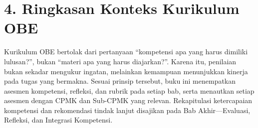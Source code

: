 \documentclass[../main.tex]{subfiles}
\begin{document}
\section*{4. Ringkasan Konteks Kurikulum OBE}

Kurikulum OBE bertolak dari pertanyaan ``kompetensi apa yang harus dimiliki
lulusan?'', bukan ``materi apa yang harus diajarkan?''. Karena itu, penilaian
bukan sekadar mengukur ingatan, melainkan kemampuan menunjukkan kinerja pada
tugas yang bermakna. Sesuai prinsip tersebut, buku ini menempatkan asesmen
kompetensi, refleksi, dan rubrik pada setiap bab, serta menautkan setiap
asesmen dengan CPMK dan Sub-CPMK yang relevan. Rekapitulasi ketercapaian
kompetensi dan rekomendasi tindak lanjut disajikan pada Bab Akhir---Evaluasi,
Refleksi, dan Integrasi Kompetensi.
\end{document}
